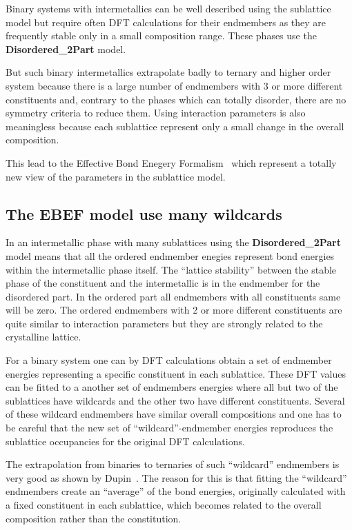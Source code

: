 \documentclass{article}
\begin{document}
\begin{appendices}
Binary systems with intermetallics can be well described using the
sublattice model but require often DFT calculations for their
endmembers as they are frequently stable only in a small composition
range.  These phases use the {\bf Disordered\_2Part} model.

But such binary intermetallics extrapolate badly to ternary and higher
order system because there is a large number of endmembers with 3 or
more different constituents and, contrary to the phases which can
totally disorder, there are no symmetry criteria to reduce them.
Using interaction parameters is also meaningless because each
sublattice represent only a small change in the overall composition.

This lead to the Effective Bond Enegery Formalism~\cite{18Dup} which
represent a totally new view of the parameters in the sublattice
model.

\subsection{The EBEF model use many wildcards}\label{sec:ebef}

In an intermetallic phase with many sublattices using the {\bf
  Disordered\_2Part} model means that all the ordered endmember
enegies represent bond energies within the intermetallic phase itself.
The ``lattice stability'' between the stable phase of the constituent
and the intermetallic is in the endmember for the disordered part.  In
the ordered part all endmembers with all constituents same will be
zero.  The ordered endmembers with 2 or more different constituents
are quite similar to interaction parameters but they are strongly
related to the crystalline lattice.

For a binary system one can by DFT calculations obtain a set of
endmember energies representing a specific constituent in each
sublattice.  These DFT values can be fitted to a another set of
endmembers energies where all but two of the sublattices have
wildcards and the other two have different constituents.  Several of
these wildcard endmembers have similar overall compositions and one
has to be careful that the new set of ``wildcard''-endmember energies
reproduces the sublattice occupancies for the original DFT
calculations.

The extrapolation from binaries to ternaries of such ``wildcard''
endmembers is very good as shown by Dupin~\cite{18Dup}.  The reason
for this is that fitting the ``wildcard'' endmembers create an
``average'' of the bond energies, originally calculated with a fixed
constituent in each sublattice, which becomes related to the overall
composition rather than the constitution.


\end{appendices}
\end{document}
